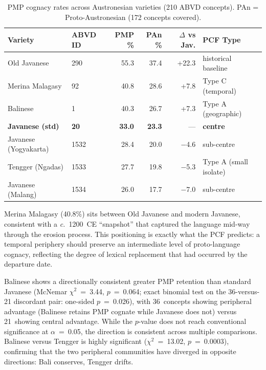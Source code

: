\documentclass[12pt,a4paper]{article}
\begin{document}
\begin{table}[htbp]
\centering
\caption{PMP cognacy rates across Austronesian varieties (210 ABVD concepts). PAn = Proto-Austronesian (172 concepts covered).}
\label{tab:cognacy}
\begin{tabular}{llrrrl}
\toprule
Variety & ABVD ID & PMP \% & PAn \% & $\Delta$ vs Jav. & PCF Type \\
\midrule
Old Javanese           & 290  & 55.3 & 37.4 & +22.3 & historical baseline \\
Merina Malagasy        & 92   & 40.8 & 28.6 & +7.8  & Type C (temporal) \\
Balinese               & 1    & 40.3 & 26.7 & +7.3  & Type A (geographic) \\
\textbf{Javanese (std)} & \textbf{20} & \textbf{33.0} & \textbf{23.3} & --- & \textbf{centre} \\
Javanese (Yogyakarta)  & 1532 & 28.4 & 20.0 & $-$4.6  & sub-centre \\
Tengger (Ngadas)       & 1533 & 27.7 & 19.8 & $-$5.3  & Type A (small isolate) \\
Javanese (Malang)      & 1534 & 26.0 & 17.7 & $-$7.0  & sub-centre \\
\bottomrule
\end{tabular}
\end{table}

Merina Malagasy (40.8\%) sits between Old Javanese and modern Javanese, consistent with a \textit{c.}~1200~CE ``snapshot'' that captured the language mid-way through the erosion process. This positioning is exactly what the PCF predicts: a temporal periphery should preserve an intermediate level of proto-language cognacy, reflecting the degree of lexical replacement that had occurred by the departure date.

Balinese shows a directionally consistent greater PMP retention than standard Javanese (McNemar $\chi^2$~=~3.44, $p$~=~0.064; exact binomial test on the 36-versus-21 discordant pair: one-sided $p$~=~0.026), with 36~concepts showing peripheral advantage (Balinese retains PMP cognate while Javanese does not) versus 21~showing central advantage. While the $p$-value does not reach conventional significance at $\alpha$~=~0.05, the direction is consistent across multiple comparisons. Balinese versus Tengger is highly significant ($\chi^2$~=~13.02, $p$~=~0.0003), confirming that the two peripheral communities have diverged in opposite directions: Bali conserves, Tengger drifts.
\end{document}
